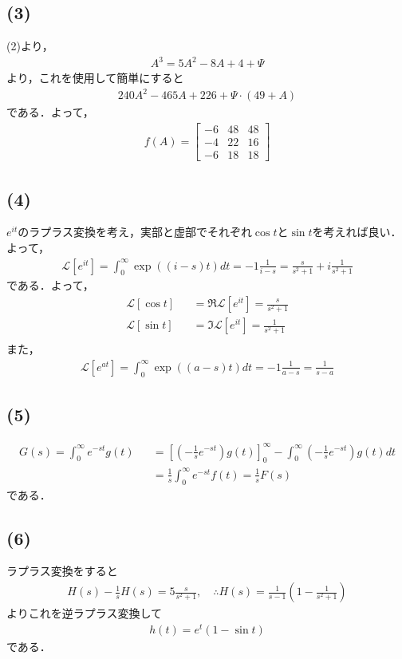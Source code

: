 \documentclass[12pt,dvipdfmx]{jsarticle}
\begin{document}
\subsection*{(3)}
(2)より，
\begin{eqnarray}
  A^3 = 5A^2 -8A+4 + \Psi
\end{eqnarray}
より，これを使用して簡単にすると
\begin{eqnarray}
  240A^2-465A + 226 + \Psi\cdot(49+A)
\end{eqnarray}
である．よって，
\begin{eqnarray}
  f(A) =
  \begin{bmatrix}
    -6 & 48 & 48\\
    -4 & 22 & 16\\
    -6 & 18 & 18
  \end{bmatrix}
\end{eqnarray}
\subsection*{(4)}
$e^{it}$のラプラス変換を考え，実部と虚部でそれぞれ$\cos t$と$\sin t$を考えれば良い．よって，
\begin{eqnarray}
  \mathcal{L}[e^{it}]= \int_0^{\infty}\exp\left( (i-s)t \right)dt = -1\frac{1}{i-s}= \frac{s}{s^2+1} + i\frac{1}{s^2+1}
\end{eqnarray}
である．よって，
\begin{eqnarray}
  \mathcal{L}[\cos t] &&= \Re \mathcal{L}[e^{it}] =  \frac{s}{s^2+1}\\
  \mathcal{L}[\sin t] &&= \Im \mathcal{L}[e^{it}] =  \frac{1}{s^2+1}\\
\end{eqnarray}
また，
\begin{eqnarray}
  \mathcal{L}[e^{at}]= \int_0^{\infty}\exp\left( (a-s)t \right)dt = -1\frac{1}{a-s}= \frac{1}{s-a}
\end{eqnarray}
\subsection*{(5)}
\begin{eqnarray}
  G(s)= \int_0^{\infty}e^{-st}g(t) &&= \left[ \left( -\frac{1}{s}e^{-st} \right)g(t) \right]_0^{\infty} - \int_0^\infty  \left( -\frac{1}{s}e^{-st} \right)g(t) dt\\
  &&= \frac{1}{s}\int_0^{\infty} e^{-st}f(t) = \frac{1}{s} F(s)
\end{eqnarray}
である．
\subsection*{(6)}
ラプラス変換をすると
\begin{eqnarray}
  H(s)-\frac{1}{s}H(s) = 5 \frac{s}{s^2+1},\quad\therefore H(s) = \frac{1}{s-1}\left( 1-\frac{1}{s^2+1} \right)
\end{eqnarray}
よりこれを逆ラプラス変換して
\begin{eqnarray}
  h(t) = e^t ( 1-\sin t )
\end{eqnarray}
である．
\end{document}
